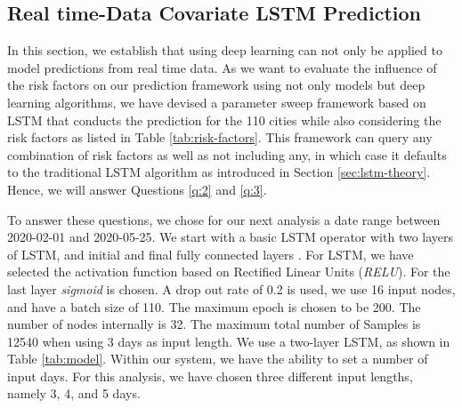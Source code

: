 \documentclass[12pt]{article}
\theoremstyle{definition}
\renewcommand{\_}{%
    \textunderscore\hspace{0pt}%
}
\begin{document}

%
%

\subsection{Real time-Data Covariate LSTM Prediction}
\label{sec:lstm-covariate}

In this  section, we establish that using deep learning can not only be applied to model predictions from  real time data. As we want to evaluate the influence of the risk factors on our prediction framework using not only models but deep learning algorithms, we have devised a parameter sweep framework based on LSTM that conducts the prediction for the 110 cities while also considering the risk factors as listed in Table \ref{tab:risk-factors}. This framework can query any combination of risk factors as well as not including any, in which case it defaults to the traditional LSTM algorithm as introduced in Section \ref{sec:lstm-theory}. Hence, we will answer Questions \ref{q:2} and \ref{q:3}. 

To answer these questions, we chose for our next analysis a date range between 2020-02-01 and 2020-05-25. We start with a basic LSTM operator with two layers of LSTM, and initial and final fully connected layers \cite{Kadupitiya2020-zq}. 
For LSTM, we have selected the activation function based on Rectified Linear Units ({\em RELU}). For the last layer {\em sigmoid} is chosen. A drop out rate of 0.2 is used, we use 16 input nodes, and have a batch size of 110. The maximum epoch is chosen to be 200. The number of nodes internally is 32. The maximum total number of Samples is 12540 when using 3 days as input length. We use a two-layer LSTM, as shown in Table \ref{tab:model}. Within our system, we have the ability to set a number of input days. For this analysis, we have chosen three different input lengths, namely 3, 4, and 5 days. 
\end{document}

